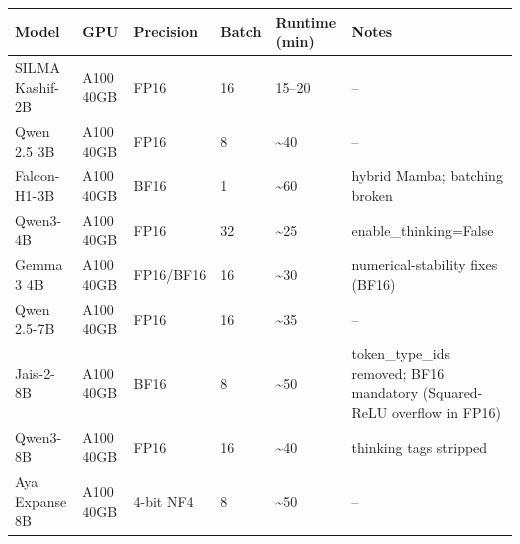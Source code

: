 \begin{tabular}{llllll}
\toprule
Model & GPU & Precision & Batch & Runtime (min) & Notes \\
\midrule
SILMA Kashif-2B & A100 40GB & FP16 & 16 & 15--20 & -- \\
Qwen 2.5 3B & A100 40GB & FP16 & 8 & \textasciitilde 40 & -- \\
Falcon-H1-3B & A100 40GB & BF16 & 1 & \textasciitilde 60 & hybrid Mamba; batching broken \\
Qwen3-4B & A100 40GB & FP16 & 32 & \textasciitilde 25 & enable\_thinking=False \\
Gemma 3 4B & A100 40GB & FP16/BF16 & 16 & \textasciitilde 30 & numerical-stability fixes (BF16) \\
Qwen 2.5-7B & A100 40GB & FP16 & 16 & \textasciitilde 35 & -- \\
Jais-2-8B & A100 40GB & BF16 & 8 & \textasciitilde 50 & token\_type\_ids removed; BF16 mandatory (Squared-ReLU overflow in FP16) \\
Qwen3-8B & A100 40GB & FP16 & 16 & \textasciitilde 40 & thinking tags stripped \\
Aya Expanse 8B & A100 40GB & 4-bit NF4 & 8 & \textasciitilde 50 & -- \\
\bottomrule
\end{tabular}
